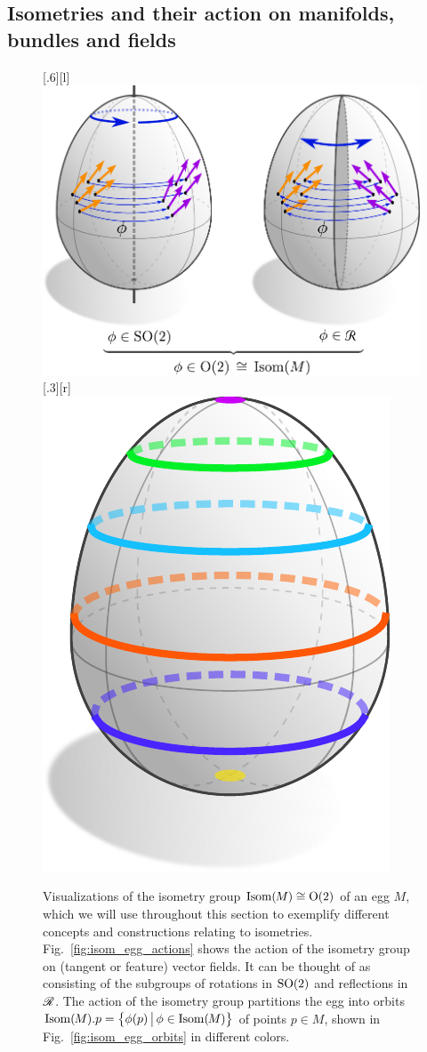 

\subsection{Isometries and their action on manifolds, bundles and fields}
\label{sec:isom_background}


\begin{figure}
    \centering
        [.6\linewidth][l]{
            \includegraphics[width=.575\textwidth]{figures/isometry_egg_action.pdf}
        }
    \hfill
        [.3\linewidth][r]{
            \includegraphics[width=.26\textwidth]{figures/isometry_egg_orbits.pdf}
            \hspace*{2ex}
            \vspace*{7.0ex}
        }
    \caption{\small
        Visualizations of the isometry group $\operatorname{Isom}(\mkern-1.5mu M \mkern-.5mu) \cong \operatorname{O}(2)$ of an egg $M$, which we will use throughout this section to exemplify different concepts and constructions relating to isometries.
        Fig.~\ref{fig:isom_egg_actions} shows the action of the isometry group on (tangent or feature) vector fields.
        It can be thought of as consisting of the subgroups of rotations in $\operatorname{SO}(2)$ and reflections in $\mathscr{R}$.
        The action of the isometry group partitions the egg into orbits $\operatorname{Isom}(\mkern-1.5mu M \mkern-.5mu).p = \big\{\phi(p) \,\big|\, \phi\in\operatorname{Isom}(\mkern-1.5mu M \mkern-.5mu)\big\}$ of points $p\in M$, shown in Fig.~\ref{fig:isom_egg_orbits} in different colors.
}
\end{figure}
